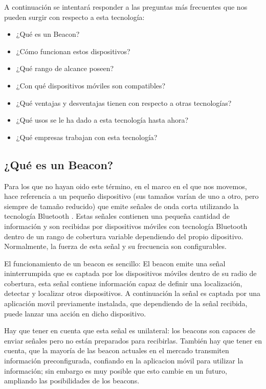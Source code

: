 A continuación se intentará responder a las preguntas más frecuentes que nos pueden surgir con respecto a esta tecnología:


\begin{itemize}
\item ¿Qué es un Beacon?
\item ¿Cómo funcionan estos dispositivos?
\item ¿Qué rango de alcance poseen?
\item ¿Con qué dispositivos móviles son compatibles? 
\item ¿Qué ventajas y desventajas tienen con respecto a otras tecnologías?
\item ¿Qué usos se le ha dado a esta tecnología hasta ahora?
\item ¿Qué empresas trabajan con esta tecnología?
\end{itemize}

\subsection{¿Qué es un Beacon?}

Para los que no hayan oido este término, en el marco en el que nos movemos, hace referencia a un pequeño dispositivo (sus tamaños varían de uno a otro, pero siempre de tamaño reducido) que emite señales de onda corta utilizando la tecnología Bluetooth \cite{URL::Bluetooth}. Estas señales contienen una pequeña cantidad de información y son recibidas por dispositivos móviles con tecnología Bluetooth dentro de un rango de cobertura variable dependiendo del propio dipositivo. Normalmente, la fuerza de esta señal y su frecuencia son configurables.


El funcionamiento de un beacon es sencillo: El beacon emite una señal ininterrumpida que es captada por los dispositivos móviles dentro de su radio de cobertura, esta señal contiene información capaz de definir una localización, detectar y localizar otros dispositivos. A continuación la señal es captada por una aplicación movil previamente instalada, que dependiendo de la señal recibida, puede lanzar una acción en dicho dispositivo.


Hay que tener en cuenta que esta señal es unilateral: los beacons son capaces de enviar señales pero no están preparados para recibirlas. También hay que tener en cuenta, que la mayoría de las beacon actuales en el mercado transmiten información preconfigurada, confiando en la aplicacion móvil para utilizar la información; sin embargo es muy posible que esto cambie en un futuro, ampliando las posibilidades de los beacons.

